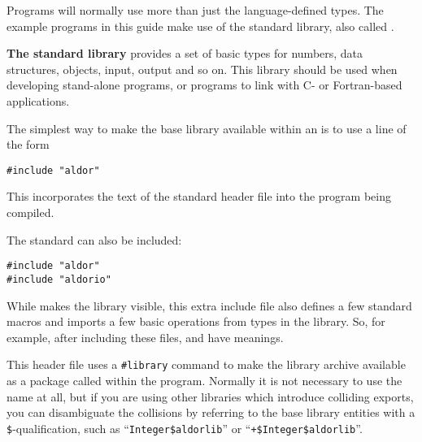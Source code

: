 
Programs will normally use more than just the language-defined types.  
The example programs in this guide make use of 
the standard \asharp{} library, also called \libaldor{}.

{\bf The standard \asharp{} library}
provides a set of basic types for numbers, data structures, objects, 
input, output and so on.
This library should be used when developing
stand-alone programs, or programs to link with C- or Fortran-based applications.

The simplest way to make the base \asharp{} library available within
an \asharp{} is to use a line of the form
\begin{verbatim}
#include "aldor"
\end{verbatim}
This incorporates the text of the standard header file 
into the program being compiled.

The standard  can also be included:
\begin{verbatim}
#include "aldor"
#include "aldorio"
\end{verbatim}

While  makes the library visible, this extra include file also
defines a few standard macros and imports a few basic operations from types in
the library.  So, for example, after including these files,  and
\ttin{<<} have meanings.

This header file uses a \verb"#library" command to 
make the library archive  available
as a package called  within the program.
Normally it is not necessary to use the name  at all, but
if you are using other libraries which introduce colliding exports,
you can disambiguate the collisions by referring to the
base library entities with a \verb"$"-qualification,
such as ``\verb"Integer$aldorlib"'' or ``\verb"+$Integer$aldorlib"''.

